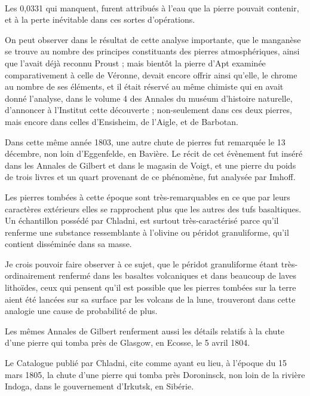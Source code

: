 \documentclass[a4paper, 12pt, oneside, french]{article}
\begin{document}
\paragraph{}
Les 0,0331 qui manquent, furent attribués à l'eau que la pierre pouvait contenir, et à la perte inévitable dans ces sortes d'opérations.

On peut observer dans le résultat de cette analyse importante, que le manganèse se trouve au nombre des principes constituants des pierres atmosphériques, ainsi que l'avait déjà reconnu Proust ; mais bientôt la pierre d'Apt examinée comparativement à celle de Véronne, devait encore offrir ainsi qu'elle, le chrome au nombre de ses éléments, et il était réservé au même chimiste qui en avait donné l'analyse, dans le volume 4 des Annales du muséum d'histoire naturelle, d'annoncer à l'Institut cette découverte ; non-seulement dans ces deux pierres, mais encore dans celles d'Ensisheim, de l'Aigle, et de Barbotan.

Dans cette même année 1803, une autre chute de pierres fut remarquée le 13 décembre, non loin d'Eggenfelde, en Bavière. Le récit de cet évènement fut inséré dans les Annales de Gilbert et dans le magasin de Voigt, et une pierre du poids de trois livres et un quart provenant de ce phénomène, fut analysée par Imhoff.

Les pierres tombées à cette époque sont très-remarquables en ce que par leurs caractères extérieurs elles se rapprochent plus que les autres des tufs basaltiques. Un échantillon possédé par Chladni, est surtout très-caractérisé parce qu'il renferme une substance ressemblante à l'olivine ou péridot granuliforme, qu'il contient disséminée dans sa masse.

Je crois pouvoir faire observer à ce sujet, que le péridot granuliforme étant très-ordinairement renfermé dans les basaltes volcaniques et dans beaucoup de laves lithoïdes, ceux qui pensent qu'il est possible que les pierres tombées sur la terre aient été lancées sur sa surface par les volcans de la lune, trouveront dans cette analogie une cause de probabilité de plus.

Les mêmes Annales de Gilbert renferment aussi les détails relatifs à la chute d'une pierre qui tomba près de Glasgow, en Ecosse, le 5 avril 1804.

Le Catalogue publié par Chladni, cite comme ayant eu lieu, à l'époque du 15 mars 1805, la chute d'une pierre qui tomba près Doroninsck, non loin de la rivière Indoga, dans le gouvernement d'Irkutsk, en Sibérie.
\end{document}
